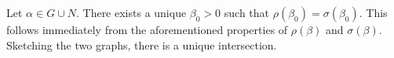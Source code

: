 
\begin{lemma}
  Let $\alpha\in G\cup N$.
  There exists a unique $\beta_0>0$ such that $\rho(\beta_0)=\sigma(\beta_0)$.
  This follows immediately from the aforementioned properties of $\rho(\beta)$ and $\sigma(\beta)$.
  Sketching the two graphs, there is a unique intersection.

\end{lemma}
